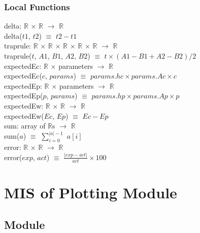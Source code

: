 \documentclass[12pt]{article}
\begin{document}
\subsubsection{Local Functions}

delta: $\mathbb{R}$ $\times$ $\mathbb{R}$ $\rightarrow$ $\mathbb{R}$ \\
delta($t1$, $t2$) $\equiv$ $t2 - t1$ \\
\newline
traprule: $\mathbb{R}$ $\times$ $\mathbb{R}$ $\times$ $\mathbb{R}$ $\times$ $\mathbb{R}$ $\times$ $\mathbb{R}$ $\rightarrow$ $\mathbb{R}$ \\
traprule($t$, $A1$, $B1$, $A2$, $B2$) $\equiv$ $t \times (A1 - B1 + A2 - B2) / 2$ \\
\newline
expectedEc: $\mathbb{R}$ $\times$ parameters $\rightarrow$ $\mathbb{R}$ \\
expectedEc($c$, $params$) $\equiv$ $params.hc \times params.Ac \times c$ \\
\newline
expectedEp: $\mathbb{R}$ $\times$ parameters $\rightarrow$ $\mathbb{R}$ \\
expectedEp($p$, $params$) $\equiv$ $params.hp \times params.Ap \times p$ \\
\newline
expectedEw: $\mathbb{R}$ $\times$ $\mathbb{R}$ $\rightarrow$ $\mathbb{R}$ \\
expectedEw($Ec$, $Ep$) $\equiv$ $Ec - Ep$ \\
\newline
sum: array of $\mathbb{R}$s $\rightarrow$ $\mathbb{R}$ \\
sum($a$) $\equiv$ $\sum_{i=0}^{|a| - 1}$ $a[i]$ \\
\newline
error: $\mathbb{R}$ $\times$ $\mathbb{R}$ $\rightarrow$ $\mathbb{R}$ \\
error($exp$, $act$) $\equiv$ $\frac{|exp - act|}{act} \times 100$ \\

\newpage
\section{MIS of Plotting Module} \label{Plot}

\subsection{Module}
\end{document}
